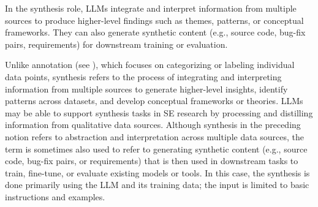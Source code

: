 \label{sec:llms-for-synthesis}

In the synthesis role, LLMs integrate and interpret information from multiple sources to produce higher-level findings such as themes, patterns, or conceptual frameworks. They can also generate synthetic content (e.g., source code, bug-fix pairs, requirements) for downstream training or evaluation.


Unlike annotation (see \annotators), which focuses on categorizing or labeling individual data points, synthesis refers to the process of integrating and interpreting information from multiple sources to generate higher-level insights, identify patterns across datasets, and develop conceptual frameworks or theories. LLMs may be able to support synthesis tasks in SE research by processing and distilling information from qualitative data sources. 
Although synthesis in the preceding notion refers to abstraction and interpretation across multiple data sources, the term is sometimes also used to refer to generating synthetic content (e.g., source code, bug-fix pairs, or requirements) that is then used in downstream tasks to train, fine-tune, or evaluate existing models or tools.
In this case, the synthesis is done primarily using the LLM and its training data; the input is limited to basic instructions and examples.


